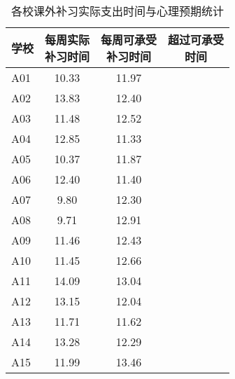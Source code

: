 \documentclass[cn, 11pt, fancy, hide]{elegantbook}
\begin{document}
\begin{table}[!h]

\caption{\label{tab:unnamed-chunk-22}各校课外补习实际支出时间与心理预期统计}
\centering
\fontsize{12}{14}\selectfont
\begin{tabular}{lccc}
\toprule
学校 & \makecell[c]{每周实际 \\ 补习时间} & \makecell[c]{每周可承受 \\ 补习时间} & \makecell[c]{超过可承受 \\ 时间}\\
\midrule
\rowcolor{gray!6}  A01 & 10.33 & 11.97 & \multicolumn{1}{r}{\cellcolor[HTML]{F3C57B}{\textcolor{black}{-1.64}}}\\
A02 & 13.83 & 12.40 & \multicolumn{1}{r}{\cellcolor[HTML]{db735c}{\textcolor{black}{1.42}}}\\
\rowcolor{gray!6}  A03 & 11.48 & 12.52 & \multicolumn{1}{r}{\cellcolor[HTML]{F3C57B}{\textcolor{black}{-1.04}}}\\
A04 & 12.85 & 11.33 & \multicolumn{1}{r}{\cellcolor[HTML]{db735c}{\textcolor{black}{1.52}}}\\
\rowcolor{gray!6}  A05 & 10.37 & 11.87 & \multicolumn{1}{r}{\cellcolor[HTML]{F3C57B}{\textcolor{black}{-1.49}}}\\
A06 & 12.40 & 11.40 & \multicolumn{1}{r}{\cellcolor[HTML]{db735c}{\textcolor{black}{1}}}\\
\rowcolor{gray!6}  A07 & 9.80 & 12.30 & \multicolumn{1}{r}{\cellcolor[HTML]{F3C57B}{\textcolor{black}{-2.51}}}\\
A08 & 9.71 & 12.91 & \multicolumn{1}{r}{\cellcolor[HTML]{F3C57B}{\textcolor{black}{-3.2}}}\\
\rowcolor{gray!6}  A09 & 11.46 & 12.43 & \multicolumn{1}{r}{\cellcolor[HTML]{F3C57B}{\textcolor{black}{-0.96}}}\\
A10 & 11.45 & 12.66 & \multicolumn{1}{r}{\cellcolor[HTML]{F3C57B}{\textcolor{black}{-1.21}}}\\
\rowcolor{gray!6}  A11 & 14.09 & 13.04 & \multicolumn{1}{r}{\cellcolor[HTML]{db735c}{\textcolor{black}{1.05}}}\\
A12 & 13.15 & 12.04 & \multicolumn{1}{r}{\cellcolor[HTML]{db735c}{\textcolor{black}{1.11}}}\\
\rowcolor{gray!6}  A13 & 11.71 & 11.62 & \multicolumn{1}{r}{\cellcolor[HTML]{db735c}{\textcolor{black}{0.09}}}\\
A14 & 13.28 & 12.29 & \multicolumn{1}{r}{\cellcolor[HTML]{db735c}{\textcolor{black}{0.99}}}\\
\rowcolor{gray!6}  A15 & 11.99 & 13.46 & \multicolumn{1}{r}{\cellcolor[HTML]{F3C57B}{\textcolor{black}{-1.48}}}\\

\end{tabular}
\end{table}
\end{document}
